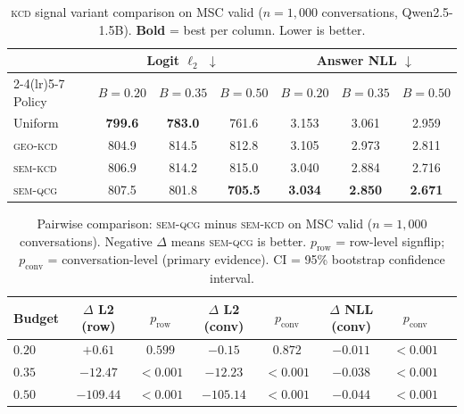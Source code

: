 \documentclass[11pt]{article}
\newcommand{\kcd}{\textsc{kcd}}
\newcommand{\semqcg}{\textsc{sem-qcg}}
\newcommand{\geokcd}{\textsc{geo-kcd}}
\newcommand{\semkcd}{\textsc{sem-kcd}}
\begin{document}
\begin{table}[t]
\centering
\caption{\kcd{} signal variant comparison on MSC valid
($n{=}1{,}000$ conversations, Qwen2.5-1.5B).
\textbf{Bold} = best per column. Lower is better.}
\label{tab:variants}
\setlength{\tabcolsep}{5pt}
\begin{tabular}{lcccccc}
\toprule
& \multicolumn{3}{c}{Logit $\ell_2$ $\downarrow$} & \multicolumn{3}{c}{Answer NLL $\downarrow$} \\
\cmidrule(lr){2-4}\cmidrule(lr){5-7}
Policy & $B{=}0.20$ & $B{=}0.35$ & $B{=}0.50$ & $B{=}0.20$ & $B{=}0.35$ & $B{=}0.50$ \\
\midrule
Uniform   & \textbf{799.6} & \textbf{783.0} & 761.6 & 3.153 & 3.061 & 2.959 \\
\geokcd{} & 804.9 & 814.5 & 812.8 & 3.105 & 2.973 & 2.811 \\
\semkcd{} & 806.9 & 814.2 & 815.0 & 3.040 & 2.884 & 2.716 \\
\semqcg{} & 807.5 & 801.8 & \textbf{705.5} & \textbf{3.034} & \textbf{2.850} & \textbf{2.671} \\
\bottomrule
\end{tabular}
\end{table}

\begin{table}[t]
\centering
\caption{Pairwise comparison: \semqcg{} minus \semkcd{}
on MSC valid ($n{=}1{,}000$ conversations).
Negative $\Delta$ means \semqcg{} is better.
$p_\text{row}$ = row-level signflip; $p_\text{conv}$ = conversation-level
(primary evidence). CI = 95\% bootstrap confidence interval.}
\label{tab:pairwise_msc}
\setlength{\tabcolsep}{4pt}
\begin{tabular}{lccccccc}
\toprule
Budget & $\Delta$ L2 (row) & $p_\text{row}$ & $\Delta$ L2 (conv) & $p_\text{conv}$ & $\Delta$ NLL (conv) & $p_\text{conv}$ \\
\midrule
$0.20$ & $+0.61$ & $0.599$ & $-0.15$ & $0.872$ & $-0.011$ & $<0.001$ \\
$0.35$ & $-12.47$ & $\mathbf{<}0.001$ & $-12.23$ & $\mathbf{<}0.001$ & $-0.038$ & $\mathbf{<}0.001$ \\
$0.50$ & $-109.44$ & $\mathbf{<}0.001$ & $-105.14$ & $\mathbf{<}0.001$ & $-0.044$ & $\mathbf{<}0.001$ \\
\bottomrule
\end{tabular}
\end{table}
\end{document}
